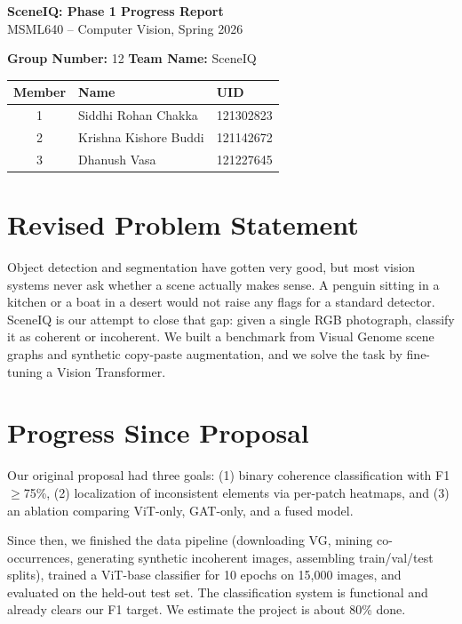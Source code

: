 \documentclass[10pt,a4paper]{article}
\begin{document}
\begin{center}
{\Large \textbf{SceneIQ: Phase 1 Progress Report}} \\[3pt]
{\normalsize MSML640 -- Computer Vision, Spring 2026}
\end{center}

\vspace{2pt}

\textbf{Group Number:} 12 \hfill \textbf{Team Name:} SceneIQ

\vspace{2pt}
\begin{center}
\begin{tabular}{cll}
\toprule
\textbf{Member} & \textbf{Name} & \textbf{UID} \\
\midrule
1 & Siddhi Rohan Chakka & 121302823 \\
2 & Krishna Kishore Buddi & 121142672 \\
3 & Dhanush Vasa & 121227645 \\
\bottomrule
\end{tabular}
\end{center}

\section{Revised Problem Statement}

Object detection and segmentation have gotten very good, but most vision systems never ask whether a scene actually makes sense. A penguin sitting in a kitchen or a boat in a desert would not raise any flags for a standard detector. SceneIQ is our attempt to close that gap: given a single RGB photograph, classify it as coherent or incoherent. We built a benchmark from Visual Genome scene graphs and synthetic copy-paste augmentation, and we solve the task by fine-tuning a Vision Transformer.

\section{Progress Since Proposal}

Our original proposal had three goals: (1) binary coherence classification with F1 $\geq$75\%, (2) localization of inconsistent elements via per-patch heatmaps, and (3) an ablation comparing ViT-only, GAT-only, and a fused model.

Since then, we finished the data pipeline (downloading VG, mining co-occurrences, generating synthetic incoherent images, assembling train/val/test splits), trained a ViT-base classifier for 10 epochs on 15,000 images, and evaluated on the held-out test set. The classification system is functional and already clears our F1 target. We estimate the project is about 80\% done.
\end{document}
